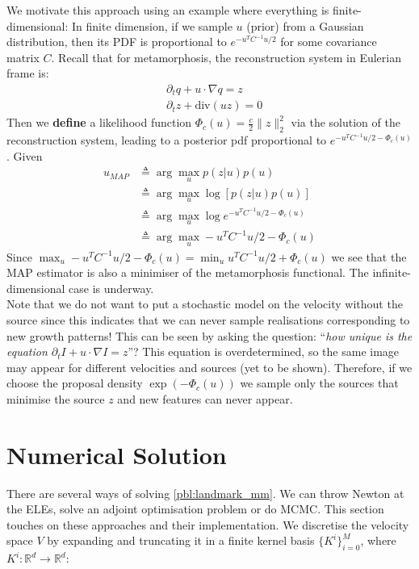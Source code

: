 \documentclass{article}
\newcommand{\norm}[2]{\| #1 \|_{ #2 }}
\newcommand{\ltwonorm}[1]{\norm{ #1 }{2}}
\begin{document}
We motivate this approach using an example where everything is finite-dimensional:
In finite dimension, if we sample $u$ (prior) from a Gaussian distribution,
then its PDF is proportional to $e^{-u^TC^{-1}u/2}$ for some covariance matrix
$C$. Recall that for metamorphosis, the reconstruction system in Eulerian frame
is:
\begin{subequations}\label{eq:reconst}
\begin{align}
& \partial_t q + u\cdot\nabla q = z\\
& \partial_t z + \text{div}(u z) = 0
\end{align}
\end{subequations}
Then we \textbf{define} a likelihood function $\Phi_c(u)=\frac c2\ltwonorm{z}^2$
via the solution of the reconstruction system, leading to a posterior pdf
proportional to $e^{-u^TC^{-1}u/2 - \Phi_c(u)}$.
Given
\begin{align*}
u_{MAP} & \triangleq \arg\max_u p(z|u)p(u)\\
        & \triangleq \arg\max_u \log [ p(z|u)p(u)]\\
        & \triangleq \arg\max_u \log e^{-u^TC^{-1}u/2 - \Phi_c(u)}\\
        & \triangleq \arg\max_u - u^TC^{-1}u/2 - \Phi_c(u)
\end{align*}
Since $\max_u - u^TC^{-1}u/2 - \Phi_c(u)= \min_u u^TC^{-1}u/2 + \Phi_c(u)$ we
see that the MAP estimator is also a minimiser of the metamorphosis functional.
The infinite-dimensional case is underway.\\

Note that we do not want to put a stochastic model on the velocity without the
source since this indicates that we can never sample realisations corresponding
to new growth patterns! This can be seen by asking the question: ``\textit{how
unique is the equation $\partial_t I + u\cdot\nabla I = z$}''? This equation is
overdetermined, so the same image may appear for different velocities and
sources (yet to be shown). Therefore, if we choose the proposal density
$\exp(-\Phi_c(u))$ we sample only the sources that minimise the source $z$ and
new features can never appear.

\section{Numerical Solution}

There are several ways of solving \eqref{pbl:landmark_mm}. We can throw Newton
at the ELEs, solve an adjoint optimisation problem or do MCMC. This section
touches on these approaches and their implementation. We discretise the velocity
space $V$ by expanding and truncating it in a finite kernel basis
$\{K^i\}_{i=0}^M$, where $K^i : \mathbb{R}^d \rightarrow \mathbb{R}^d$:
\end{document}

